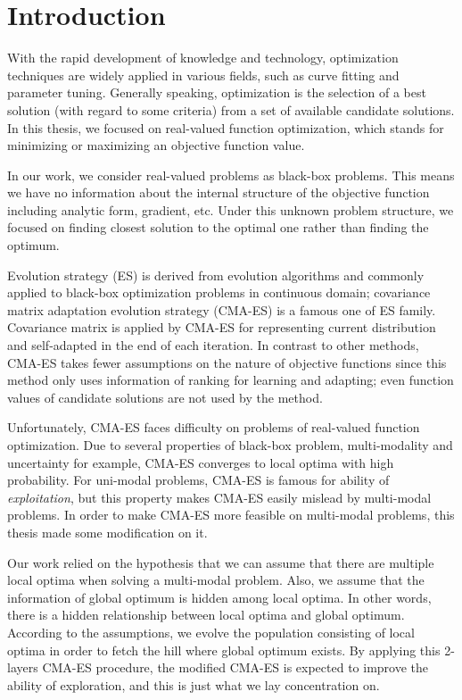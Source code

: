 \chapter{Introduction} \label{ch:introduction}

With the rapid development of knowledge and technology, optimization
techniques are widely applied in various fields, such as curve fitting
and parameter tuning.  Generally speaking, optimization is the selection
of a best solution (with regard to some criteria) from a set of
available candidate solutions.  In this thesis, we focused on
real-valued function optimization, which stands for minimizing or
maximizing an objective function value.

In our work, we consider real-valued problems as black-box problems.
This means we have no information about the internal structure of the
objective function including analytic form, gradient, etc.  Under this
unknown problem structure, we focused on finding closest solution to the
optimal one rather than finding the optimum.

Evolution strategy (ES) is derived from evolution algorithms and
commonly applied to black-box optimization problems in continuous
domain; covariance matrix adaptation evolution strategy (CMA-ES) is a
famous one of ES family.  Covariance matrix is applied by CMA-ES for
representing current distribution and self-adapted in the end of each
iteration.  In contrast to other methods, CMA-ES takes fewer assumptions
on the nature of objective functions since this method only uses
information of ranking for learning and adapting; even function values
of candidate solutions are not used by the method.

Unfortunately, CMA-ES faces difficulty on problems of real-valued
function optimization. Due to several properties of black-box problem,
multi-modality and uncertainty for example, CMA-ES converges to local
optima with high probability. For uni-modal problems, CMA-ES is famous
for ability of \emph{exploitation}, but this property makes CMA-ES
easily mislead by multi-modal problems.  In order to make CMA-ES more
feasible on multi-modal problems, this thesis made some modification on
it.

Our work relied on the hypothesis that we can assume that there are
multiple local optima when solving a multi-modal problem.
Also, we assume that the information of global optimum is hidden among
local optima.  In other words, there is a hidden relationship between
local optima and global optimum.  According to the assumptions, we
evolve the population consisting of local optima in order to fetch the
hill where global optimum exists.  By applying this 2-layers CMA-ES
procedure, the modified CMA-ES is expected to improve the ability of
exploration, and this is just what we lay concentration on.

